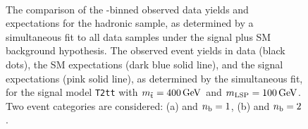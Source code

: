 \begin{figure}[h!]
  \begin{center}
     \\
    \caption{\label{fig:t2tt-best-fit-400_100}The comparison of
      the \scalht-binned observed data yields and expectations for the
      hadronic sample, as determined by a simultaneous fit to all data
      samples under the signal plus SM background hypothesis. The
      observed event yields in data (black dots), the SM expectations
      (dark blue solid line), and the signal expectations (pink solid
      line), as determined by the simultaneous fit, for the
      signal model \texttt{T2tt} with $m_{\tilde{\rm t}} = 400\,\text{Ge\hspace{-.08em}V}$ and
      $m_{\text{LSP}} = 100\,\text{Ge\hspace{-.08em}V}$. Two event categories are
      considered: (a) \njethigh and $n_{\text{b}} = 1$, (b) \njethigh and
      $n_{\text{b}} = 2$.}
  \end{center}
\end{figure}
